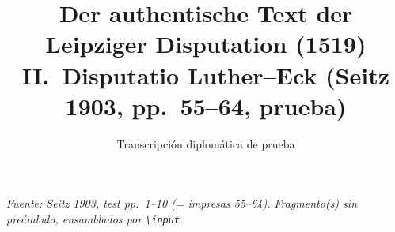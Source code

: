 \documentclass[11pt,a4paper]{article}
\title{Der authentische Text der Leipziger Disputation (1519)\\II.\ Disputatio Luther--Eck (Seitz 1903, pp.\ 55--64, prueba)}
\author{Transcripci\'on diplom\'atica de prueba}
\date{}
\begin{document}
\maketitle
\noindent\textit{Fuente: Seitz 1903, test pp.\ 1--10 (= impresas 55--64). Fragmento(s) sin pre\'ambulo, ensamblados por \texttt{\textbackslash input}.}

\bigskip






\end{document}
